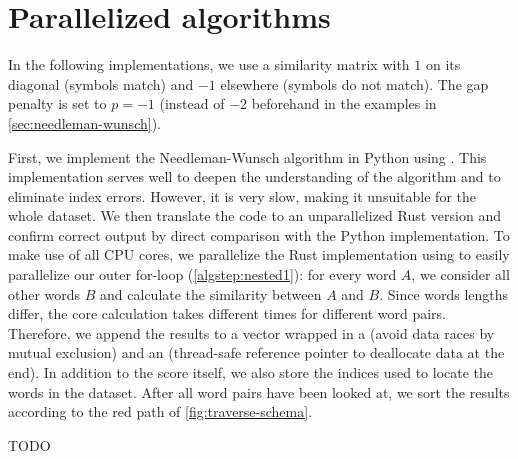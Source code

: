 \section{Parallelized algorithms}
\label{sec:impl}

In the following implementations, we use a similarity matrix with $1$ on its diagonal (symbols match) and $-1$ elsewhere (symbols do not match). The gap penalty is set to $p=-1$ (instead of $-2$ beforehand in the examples in \autoref{sec:needleman-wunsch}).

First, we implement the Needleman-Wunsch algorithm in Python using . This implementation serves well to deepen the understanding of the algorithm and to eliminate index errors. However, it is very slow, making it unsuitable for the whole dataset. We then translate the code to an unparallelized Rust version and confirm correct output by direct comparison with the Python implementation. To make use of all CPU cores, we parallelize the Rust implementation using  to easily parallelize our outer for-loop (\autoref{algstep:nested1}): for every word $A$, we consider all other words $B$ and calculate the similarity between $A$ and $B$. Since words lengths differ, the core calculation takes different times for different word pairs. Therefore, we append the results to a vector wrapped in a  (avoid data races by mutual exclusion) and an  (thread-safe reference pointer to deallocate data at the end). In addition to the score itself, we also store the indices used to locate the words in the dataset. After all word pairs have been looked at, we sort the results according to the red path of \autoref{fig:traverse-schema}.

TODO
